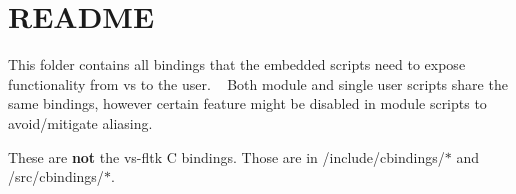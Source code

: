 \chapter{README}
\hypertarget{md_bindings_2README}{}\label{md_bindings_2README}
This folder contains all bindings that the embedded scripts need to expose functionality from {\ttfamily vs} to the user. ~\newline
 Both module and single user scripts share the same bindings, however certain feature might be disabled in module scripts to avoid/mitigate aliasing. ~\newline


These are {\bfseries{not}} the vs-\/fltk C bindings. Those are in {\ttfamily /include/cbindings/\texorpdfstring{$\ast$}{*}} and {\ttfamily /src/cbindings/\texorpdfstring{$\ast$}{*}}. 